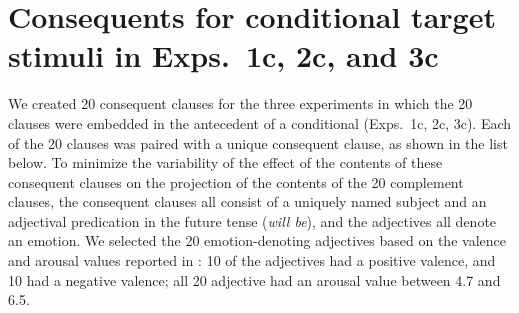 \documentclass[11pt,fleqn]{article}
\newcommand{\6}{\mbox{$[\hspace*{-.6mm}[$}}
\newcommand{\9}{\mbox{$]\hspace*{-.6mm}]$}}
\begin{document}
\section{Consequents for conditional target stimuli in Exps.~1c, 2c, and 3c}\label{a-consequents}

We created 20 consequent clauses for the three experiments in which the 20 clauses were embedded in the antecedent of a conditional (Exps.~1c, 2c, 3c). Each of the 20 clauses was paired with a unique consequent clause, as shown in the list below. To minimize the variability of the effect of the contents of these consequent clauses on the projection of the contents of the 20 complement clauses, the consequent clauses all consist of a uniquely named subject and an adjectival predication in the future tense ({\em will be}), and the adjectives all denote an emotion. We selected the 20 emotion-denoting adjectives based on the valence and arousal values reported in \citealt{warriner-etal2013}: 10 of the adjectives had a positive valence, and 10 had a negative valence; all 20 adjective had an arousal value between 4.7 and 6.5. 
\end{document}
